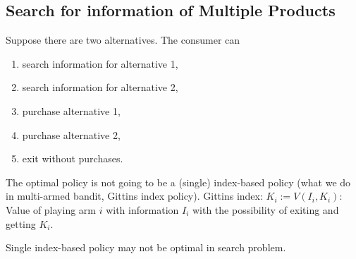 \documentclass[11pt]{elegantbook}
\begin{document}
\subsection{Search for information of Multiple Products}
Suppose there are two alternatives. The consumer can
\begin{enumerate}
    \item search information for alternative 1,
    \item search information for alternative 2,
    \item purchase alternative 1,
    \item purchase alternative 2,
    \item exit without purchases.
\end{enumerate}
The optimal policy is not going to be a (single) index-based policy (what we do in multi-armed bandit, Gittins index policy). Gittins index: $K_i:=V(I_i,K_i)$: Value of playing arm $i$ with information $I_i$ with the possibility of exiting and getting $K_i$.
\begin{claim}
    Single index-based policy may not be optimal in search problem.
\end{claim}
\end{document}
